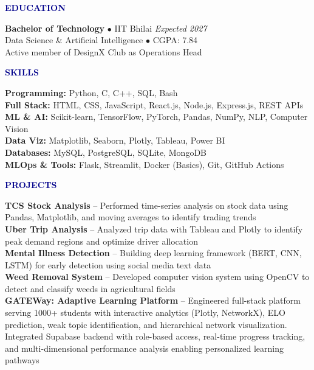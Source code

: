 \documentclass[11pt]{article}
\newcommand{\sectionheading}[1]{
  {\textbf{\textcolor{darkblue}{\large #1}}}
  \vspace{2pt}
}
\begin{document}
\sectionheading{EDUCATION}
\noindent \textbf{Bachelor of Technology} $\bullet$ IIT Bhilai \hfill \textit{Expected 2027} \\
Data Science \& Artificial Intelligence $\bullet$ CGPA: 7.84 \\
Active member of DesignX Club as Operations Head
\vspace{6pt}

\sectionheading{SKILLS}
\noindent \textbf{Programming:} Python, C, C++, SQL, Bash \\
\noindent \textbf{Full Stack:} HTML, CSS, JavaScript, React.js, Node.js, Express.js, REST APIs \\
\noindent \textbf{ML \& AI:} Scikit-learn, TensorFlow, PyTorch, Pandas, NumPy, NLP, Computer Vision \\
\noindent \textbf{Data Viz:} Matplotlib, Seaborn, Plotly, Tableau, Power BI \\
\noindent \textbf{Databases:} MySQL, PostgreSQL, SQLite, MongoDB \\
\noindent \textbf{MLOps \& Tools:} Flask, Streamlit, Docker (Basics), Git, GitHub Actions
\vspace{6pt}

\sectionheading{PROJECTS}
\noindent \textbf{TCS Stock Analysis} -- Performed time-series analysis on stock data using Pandas, Matplotlib, and moving averages to identify trading trends \\[2pt]
\noindent \textbf{Uber Trip Analysis} -- Analyzed trip data with Tableau and Plotly to identify peak demand regions and optimize driver allocation \\[2pt]
\noindent \textbf{Mental Illness Detection} -- Building deep learning framework (BERT, CNN, LSTM) for early detection using social media text data \\[2pt]
\noindent \textbf{Weed Removal System} -- Developed computer vision system using OpenCV to detect and classify weeds in agricultural fields \\[2pt]
\noindent \textbf{GATEWay: Adaptive Learning Platform} -- Engineered full-stack platform serving 1000+ students with interactive analytics (Plotly, NetworkX), ELO prediction, weak topic identification, and hierarchical network visualization. Integrated Supabase backend with role-based access, real-time progress tracking, and multi-dimensional performance analysis enabling personalized learning pathways
\end{document}
